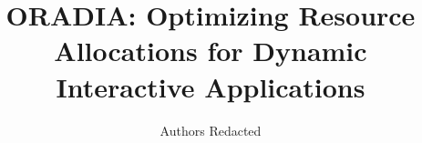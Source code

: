 \documentclass[pageno]{jpaper}
\newcommand{\pacora}{ORADIA\xspace}
\begin{document}
\title{\pacora: Optimizing Resource Allocations for Dynamic Interactive Applications}
\author{Authors Redacted}
\date{}
\maketitle

\thispagestyle{empty}
















\appendix



\end{document}
